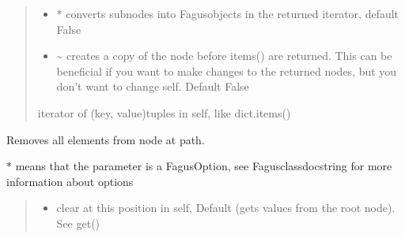 \documentclass[a4paper,10pt,english]{sphinxmanual}
\begin{document}
\begin{fulllineitems}
\begin{fulllineitems}
\begin{quote}
\begin{description}
\begin{itemize}
\item {}
\sphinxAtStartPar
{} \textendash{} * converts sub\sphinxhyphen{}nodes into Fagus\sphinxhyphen{}objects in the returned iterator, default False

\item {}
\sphinxAtStartPar
{} \textendash{} \textasciitilde{} creates a copy of the node before items() are returned. This can be beneficial if you want to make
changes to the returned nodes, but you don’t want to change self. Default False

\end{itemize}

\sphinxAtStartPar
iterator of (key, value)\sphinxhyphen{}tuples in self, like dict.items()

\end{description}\end{quote}

\end{fulllineitems}


\begin{fulllineitems}
\label{\detokenize{fagus.fagus:fagus.fagus.Fagus.clear}}
\pysigstartsignatures
{}
\pysigstopsignatures
\sphinxAtStartPar
Removes all elements from node at path.

\sphinxAtStartPar
* means that the parameter is a FagusOption, see Fagus\sphinxhyphen{}class\sphinxhyphen{}docstring for more information about options
\begin{quote}\begin{description}
\begin{itemize}
\item {}
\sphinxAtStartPar
{} \textendash{} clear at this position in self, Default  (gets values from the root node). See get()


\end{itemize}
\end{description}
\end{quote}
\end{fulllineitems}
\end{fulllineitems}
\end{document}
